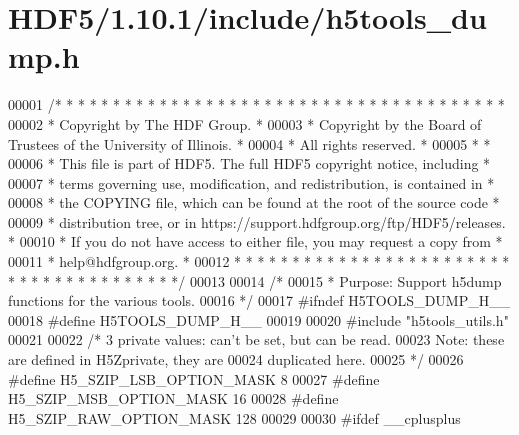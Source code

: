 \hypertarget{_h_d_f5_21_810_81_2include_2h5tools__dump_8h_source}{}\section{H\+D\+F5/1.10.1/include/h5tools\+\_\+dump.h}
\label{_h_d_f5_21_810_81_2include_2h5tools__dump_8h_source}

\begin{DoxyCode}
00001 \textcolor{comment}{/* * * * * * * * * * * * * * * * * * * * * * * * * * * * * * * * * * * * * * *}
00002 \textcolor{comment}{ * Copyright by The HDF Group.                                               *}
00003 \textcolor{comment}{ * Copyright by the Board of Trustees of the University of Illinois.         *}
00004 \textcolor{comment}{ * All rights reserved.                                                      *}
00005 \textcolor{comment}{ *                                                                           *}
00006 \textcolor{comment}{ * This file is part of HDF5.  The full HDF5 copyright notice, including     *}
00007 \textcolor{comment}{ * terms governing use, modification, and redistribution, is contained in    *}
00008 \textcolor{comment}{ * the COPYING file, which can be found at the root of the source code       *}
00009 \textcolor{comment}{ * distribution tree, or in https://support.hdfgroup.org/ftp/HDF5/releases.  *}
00010 \textcolor{comment}{ * If you do not have access to either file, you may request a copy from     *}
00011 \textcolor{comment}{ * help@hdfgroup.org.                                                        *}
00012 \textcolor{comment}{ * * * * * * * * * * * * * * * * * * * * * * * * * * * * * * * * * * * * * * */}
00013 
00014 \textcolor{comment}{/*}
00015 \textcolor{comment}{ * Purpose:     Support h5dump functions for the various tools.}
00016 \textcolor{comment}{ */}
00017 \textcolor{preprocessor}{#ifndef H5TOOLS\_DUMP\_H\_\_}
00018 \textcolor{preprocessor}{#define H5TOOLS\_DUMP\_H\_\_}
00019 
00020 \textcolor{preprocessor}{#include "h5tools\_utils.h"}
00021 
00022 \textcolor{comment}{/* 3 private values: can't be set, but can be read.}
00023 \textcolor{comment}{   Note: these are defined in H5Zprivate, they are}
00024 \textcolor{comment}{   duplicated here.}
00025 \textcolor{comment}{ */}
00026 \textcolor{preprocessor}{#define H5\_SZIP\_LSB\_OPTION\_MASK         8}
00027 \textcolor{preprocessor}{#define H5\_SZIP\_MSB\_OPTION\_MASK         16}
00028 \textcolor{preprocessor}{#define H5\_SZIP\_RAW\_OPTION\_MASK         128}
00029 
00030 \textcolor{preprocessor}{#ifdef \_\_cplusplus}

\end{DoxyCode}
